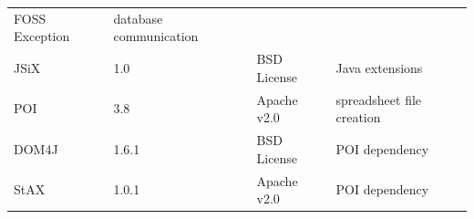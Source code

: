 \documentclass[]{article}
\begin{document}
\begin{longtable}[]{@{}llll@{}}
\begin{minipage}[t]{0.21\columnwidth}
FOSS Exception\strut
\end{minipage} & \begin{minipage}[t]{0.32\columnwidth}\raggedright\strut
database communication\strut
\end{minipage}\tabularnewline
\begin{minipage}[t]{0.16\columnwidth}\raggedright\strut
JSiX\strut
\end{minipage} & \begin{minipage}[t]{0.11\columnwidth}\raggedright\strut
1.0\strut
\end{minipage} & \begin{minipage}[t]{0.21\columnwidth}\raggedright\strut
BSD License\strut
\end{minipage} & \begin{minipage}[t]{0.32\columnwidth}\raggedright\strut
Java extensions\strut
\end{minipage}\tabularnewline
\begin{minipage}[t]{0.16\columnwidth}\raggedright\strut
POI\strut
\end{minipage} & \begin{minipage}[t]{0.11\columnwidth}\raggedright\strut
3.8\strut
\end{minipage} & \begin{minipage}[t]{0.21\columnwidth}\raggedright\strut
Apache v2.0\strut
\end{minipage} & \begin{minipage}[t]{0.32\columnwidth}\raggedright\strut
spreadsheet file creation\strut
\end{minipage}\tabularnewline
\begin{minipage}[t]{0.16\columnwidth}\raggedright\strut
DOM4J\strut
\end{minipage} & \begin{minipage}[t]{0.11\columnwidth}\raggedright\strut
1.6.1\strut
\end{minipage} & \begin{minipage}[t]{0.21\columnwidth}\raggedright\strut
BSD License\strut
\end{minipage} & \begin{minipage}[t]{0.32\columnwidth}\raggedright\strut
POI dependency\strut
\end{minipage}\tabularnewline
\begin{minipage}[t]{0.16\columnwidth}\raggedright\strut
StAX\strut
\end{minipage} & \begin{minipage}[t]{0.11\columnwidth}\raggedright\strut
1.0.1\strut
\end{minipage} & \begin{minipage}[t]{0.21\columnwidth}\raggedright\strut
Apache v2.0\strut
\end{minipage} & \begin{minipage}[t]{0.32\columnwidth}\raggedright\strut
POI dependency\strut
\end{minipage}\tabularnewline
\bottomrule
\end{longtable}
\end{document}
